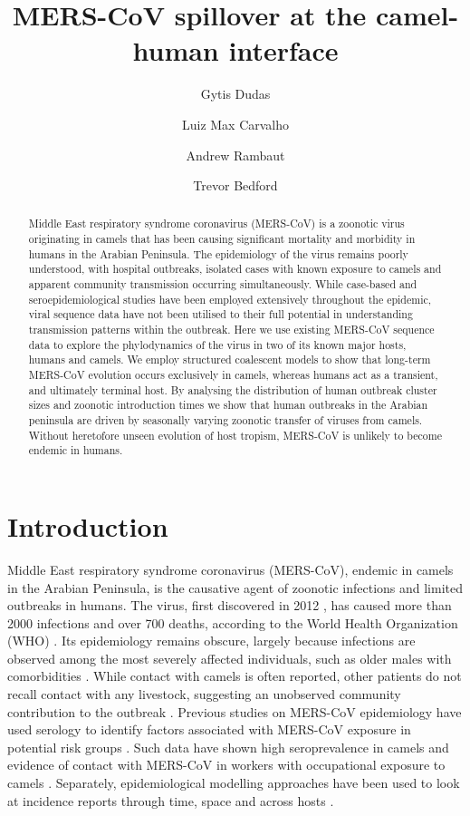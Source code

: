 \documentclass[9pt,lineno]{elife}
\title{\vspace{1.0cm} \LARGE \bf MERS-CoV spillover at the camel-human interface}
\author[1*]{Gytis Dudas}
\author[2]{Luiz Max Carvalho}
\author[2,3]{Andrew Rambaut}
\author[1]{Trevor Bedford}
\affil[1]{Vaccine and Infectious Disease Division, Fred Hutchinson Cancer Research Center, Seattle, WA, USA}
\affil[2]{Institute of Evolutionary Biology, University of Edinburgh, Edinburgh, UK}
\affil[3]{Fogarty International Center, National Institutes of Health, Bethesda, MD, USA}
\begin{document}
\maketitle

\begin{abstract}

Middle East respiratory syndrome coronavirus (MERS-CoV) is a zoonotic virus originating in camels that has been causing significant mortality and morbidity in humans in the Arabian Peninsula.
The epidemiology of the virus remains poorly understood, with hospital outbreaks, isolated cases with known exposure to camels and apparent community transmission occurring simultaneously.
While case-based and seroepidemiological studies have been employed extensively throughout the epidemic, viral sequence data have not been utilised to their full potential in understanding transmission patterns within the outbreak.
Here we use existing MERS-CoV sequence data to explore the phylodynamics of the virus in two of its known major hosts, humans and camels.
We employ structured coalescent models to show that long-term MERS-CoV evolution occurs exclusively in camels, whereas humans act as a transient, and ultimately terminal host.
By analysing the distribution of human outbreak cluster sizes and zoonotic introduction times we show that human outbreaks in the Arabian peninsula are driven by seasonally varying zoonotic transfer of viruses from camels.
Without heretofore unseen evolution of host tropism, MERS-CoV is unlikely to become endemic in humans.

\end{abstract}

\pagebreak

\section*{Introduction}
Middle East respiratory syndrome coronavirus (MERS-CoV), endemic in camels in the Arabian Peninsula, is the causative agent of zoonotic infections and limited outbreaks in humans.
The virus, first discovered in 2012 \citep{zaki_isolation_2012,boheemen_genomic_2012}, has caused more than 2000  infections and over 700 deaths, according to the World Health Organization (WHO) \citep{who_mers_summary_2017}.
Its epidemiology remains obscure, largely because infections are observed among the most severely affected individuals, such as older males with comorbidities \citep{assiri_2013,group_state_2013}.
While contact with camels is often reported, other patients do not recall contact with any livestock, suggesting an unobserved community contribution to the outbreak \citep{group_state_2013}.
Previous studies on MERS-CoV epidemiology have used serology to identify factors associated with MERS-CoV exposure in potential risk groups \citep{reusken_occupational_2015,reusken_2013}.
Such data have shown high seroprevalence in camels \citep{muller_2014,corman_antibodies_2014,chu_2014,reusken_2013,reusken_2014} and evidence of contact with MERS-CoV in workers with occupational exposure to camels \citep{reusken_occupational_2015,muller_presence_2015}.
Separately, epidemiological modelling approaches have been used to look at incidence reports through time, space and across hosts \citep{cauchemez_unraveling_2016}.
\end{document}
